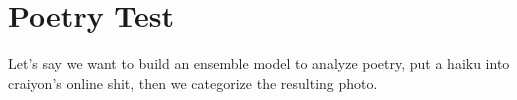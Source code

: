 \setchapterpreamble[u]{\margintoc}
\chapter{Poetry Test}

Let's say we want to build an ensemble model to analyze poetry, put a haiku into craiyon's online shit, then we categorize the resulting photo. 


